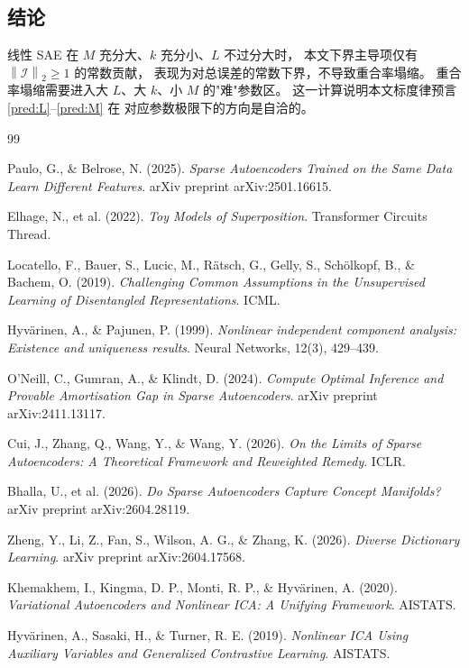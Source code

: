 \documentclass[11pt,a4paper]{article}
\theoremstyle{remark}
\newcommand{\I}{\mathcal{I}}
\newcommand{\norm}[1]{\left\lVert#1\right\rVert}
\begin{document}
\subsection{结论}

线性 SAE 在 $M$ 充分大、$k$ 充分小、$L$ 不过分大时，
本文下界主导项仅有 $\norm{\I}_2 \geq 1$ 的常数贡献，
表现为对总误差的常数下界，不导致重合率塌缩。
重合率塌缩需要进入大 $L$、大 $k$、小 $M$ 的"难"参数区。
这一计算说明本文标度律预言 \ref{pred:L}--\ref{pred:M} 在
对应参数极限下的方向是自洽的。

\begin{thebibliography}{99}

Paulo, G., \& Belrose, N. (2025).
\emph{Sparse Autoencoders Trained on the Same Data Learn Different Features}.
arXiv preprint arXiv:2501.16615.

Elhage, N., et al. (2022).
\emph{Toy Models of Superposition}.
Transformer Circuits Thread.

Locatello, F., Bauer, S., Lucic, M., Rätsch, G., Gelly, S., Schölkopf, B., \& Bachem, O. (2019).
\emph{Challenging Common Assumptions in the Unsupervised Learning of Disentangled Representations}.
ICML.

Hyvärinen, A., \& Pajunen, P. (1999).
\emph{Nonlinear independent component analysis: Existence and uniqueness results}.
Neural Networks, 12(3), 429--439.

O'Neill, C., Gumran, A., \& Klindt, D. (2024).
\emph{Compute Optimal Inference and Provable Amortisation Gap in Sparse Autoencoders}.
arXiv preprint arXiv:2411.13117.

Cui, J., Zhang, Q., Wang, Y., \& Wang, Y. (2026).
\emph{On the Limits of Sparse Autoencoders: A Theoretical Framework and Reweighted Remedy}.
ICLR.

Bhalla, U., et al. (2026).
\emph{Do Sparse Autoencoders Capture Concept Manifolds?}
arXiv preprint arXiv:2604.28119.

Zheng, Y., Li, Z., Fan, S., Wilson, A. G., \& Zhang, K. (2026).
\emph{Diverse Dictionary Learning}.
arXiv preprint arXiv:2604.17568.

Khemakhem, I., Kingma, D. P., Monti, R. P., \& Hyvärinen, A. (2020).
\emph{Variational Autoencoders and Nonlinear ICA: A Unifying Framework}.
AISTATS.

Hyvärinen, A., Sasaki, H., \& Turner, R. E. (2019).
\emph{Nonlinear ICA Using Auxiliary Variables and Generalized Contrastive Learning}.
AISTATS.


\end{thebibliography}
\end{document}

